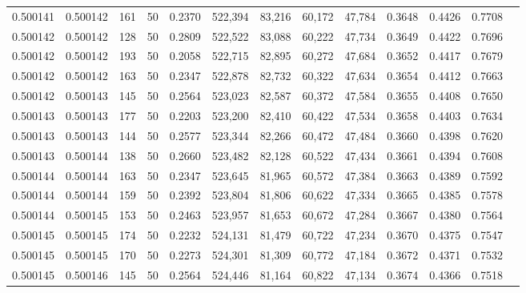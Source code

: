 \begin{tabular}{rrrrrrrrrrrrr}
0.500141 & 0.500142 &   161 &  50 &                                     0.2370 & 522,394 &  83,216 &  60,172 &  47,784 & 0.3648 & 0.4426 & 0.7708 \\
0.500142 & 0.500142 &   128 &  50 &                                     0.2809 & 522,522 &  83,088 &  60,222 &  47,734 & 0.3649 & 0.4422 & 0.7696 \\
0.500142 & 0.500142 &   193 &  50 &                                     0.2058 & 522,715 &  82,895 &  60,272 &  47,684 & 0.3652 & 0.4417 & 0.7679 \\
0.500142 & 0.500142 &   163 &  50 &                                     0.2347 & 522,878 &  82,732 &  60,322 &  47,634 & 0.3654 & 0.4412 & 0.7663 \\
0.500142 & 0.500143 &   145 &  50 &                                     0.2564 & 523,023 &  82,587 &  60,372 &  47,584 & 0.3655 & 0.4408 & 0.7650 \\
0.500143 & 0.500143 &   177 &  50 &                                     0.2203 & 523,200 &  82,410 &  60,422 &  47,534 & 0.3658 & 0.4403 & 0.7634 \\
0.500143 & 0.500143 &   144 &  50 &                                     0.2577 & 523,344 &  82,266 &  60,472 &  47,484 & 0.3660 & 0.4398 & 0.7620 \\
0.500143 & 0.500144 &   138 &  50 &                                     0.2660 & 523,482 &  82,128 &  60,522 &  47,434 & 0.3661 & 0.4394 & 0.7608 \\
0.500144 & 0.500144 &   163 &  50 &                                     0.2347 & 523,645 &  81,965 &  60,572 &  47,384 & 0.3663 & 0.4389 & 0.7592 \\
0.500144 & 0.500144 &   159 &  50 &                                     0.2392 & 523,804 &  81,806 &  60,622 &  47,334 & 0.3665 & 0.4385 & 0.7578 \\
0.500144 & 0.500145 &   153 &  50 &                                     0.2463 & 523,957 &  81,653 &  60,672 &  47,284 & 0.3667 & 0.4380 & 0.7564 \\
0.500145 & 0.500145 &   174 &  50 &                                     0.2232 & 524,131 &  81,479 &  60,722 &  47,234 & 0.3670 & 0.4375 & 0.7547 \\
0.500145 & 0.500145 &   170 &  50 &                                     0.2273 & 524,301 &  81,309 &  60,772 &  47,184 & 0.3672 & 0.4371 & 0.7532 \\
0.500145 & 0.500146 &   145 &  50 &                                     0.2564 & 524,446 &  81,164 &  60,822 &  47,134 & 0.3674 & 0.4366 & 0.7518 \\

\end{tabular}
